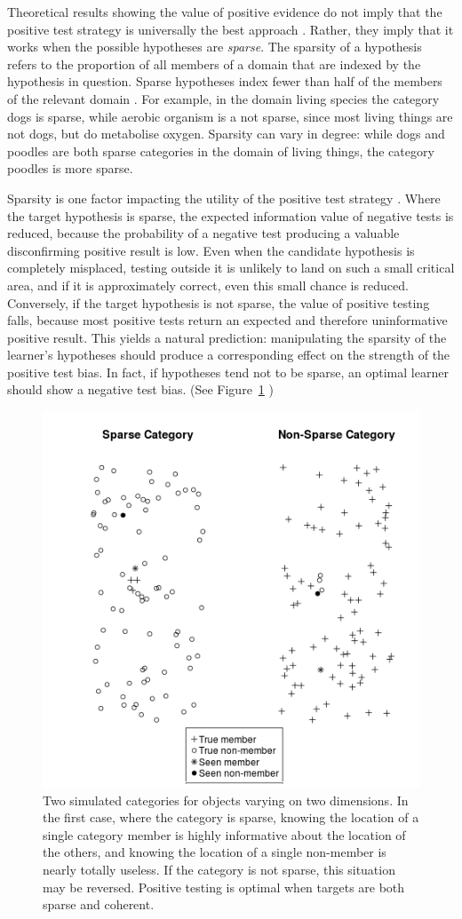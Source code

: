 \documentclass[10pt,letterpaper]{article}
\begin{document}
Theoretical results showing the value of positive evidence do not imply that the positive test strategy is universally the best approach \cite{klayman1987confirmation,austerweil2011deterministic,navarro2011sparsecat}. Rather, they imply that it works when the possible hypotheses are {\it sparse}. The sparsity of a hypothesis refers to the proportion of all members of a domain that are indexed by the hypothesis in question. Sparse hypotheses index fewer than half of the members of the relevant domain \cite{navarro2011sparsecat}. For example, in the domain {\sc living species} the category {\sc dogs} is sparse, while {\sc aerobic organism} is a not sparse, since most living things are not dogs, but do metabolise oxygen. Sparsity can vary in degree: while {\sc dogs} and {\sc poodles} are both sparse categories in the domain of living things, the category {\sc poodles} is more sparse. 


Sparsity is one factor impacting the utility of the positive test strategy \cite{klayman1987confirmation, navarro2011sparsecat}. Where the target hypothesis is sparse, the expected information value of negative tests is reduced, because the probability of a negative test producing a valuable disconfirming positive result is low.
Even when the candidate hypothesis is completely misplaced, testing outside it is unlikely to land on such a small critical area, and if it is approximately correct, even this small chance is reduced. Conversely, if the target hypothesis is not sparse, the value of positive testing falls, because most positive tests return an expected and therefore uninformative positive result. This yields a natural prediction: manipulating the sparsity of the learner's hypotheses should produce a corresponding effect on the strength of the positive test bias. In fact, if hypotheses tend not to be sparse, an optimal learner should show a negative test bias. (See Figure~\ref{sparsitydemo} )

\begin{figure}[t]
\centering
\includegraphics[width=.5\textwidth]{sparsitydemo.png}
\caption{Two simulated categories for objects varying on two dimensions. In the first case, where the category is sparse, knowing the location of a single category member is highly informative about the location of the others, and knowing the location of a single non-member is nearly totally useless. If the category is not sparse, this situation may be reversed. Positive testing is optimal when targets are both sparse and coherent.\cite{navarro2011sparsecat}}
\label{sparsitydemo}
\end{figure}
\end{document}
